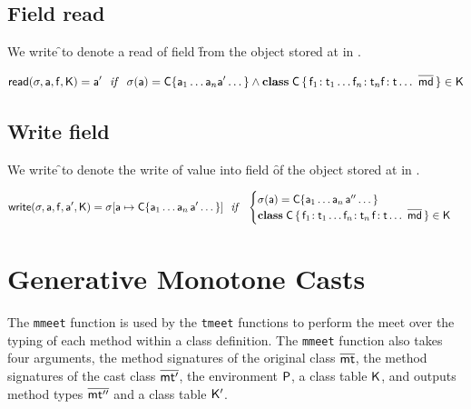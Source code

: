 \documentclass[a4paper,USenglish]{tex/lipics-v2016}
\begin{document}
\subsection{Field read}

We write \readf\s\a\f\K to denote a read of field \f from the object
stored at \a in \s.

\begin{equation*}
\readf \s\a\f\K = \ap ~~\mathit{if}~~  \s(\a) = \obj\C{\a_1\dots\a_n \ap \dots} \AND
 \Class\C {\Fdef{\f_1}{\t_1}\dots\Fdef{\f_n}{\t_n}\Ftype\f\t\dots}{\b\md}\in\K
\end{equation*}

\subsection{Write field}

We write \setf\s\a\f\ap\K to denote the write of value \ap into field \f of
the object stored at \a in \s.

\begin{equation*}
\setf \s\a\f\ap\K= \Map\s{\Bind{\a}{\obj\C{\a_1\dots\a_n\,\ap\dots}}}
  ~~\mathit{if}~~ \begin{cases}
   \s(\a) = \obj\C{\a_1\dots\a_n\,\app\dots}\\
   \Class\C{\Fdef{\f_1}{\t_1}\dots\Fdef{\f_n}{\t_n}\,\Fdef\f\t\dots}{\b\md}\in\K
\end{cases}
\end{equation*}

\section{Generative Monotone Casts}

The \texttt{mmeet} function is used by the \texttt{tmeet} functions to
perform the meet over the typing of each method within a class definition.
The \texttt{mmeet} function also takes four arguments, the method
signatures of the original class $\b\mt$, the method signatures of the cast
class $\b\mtp$, the environment $\P$, a class table $\K$, and outputs method
types $\b\mtpp$ and a class table $\Kp$. 

\hrulefill
\end{document}
